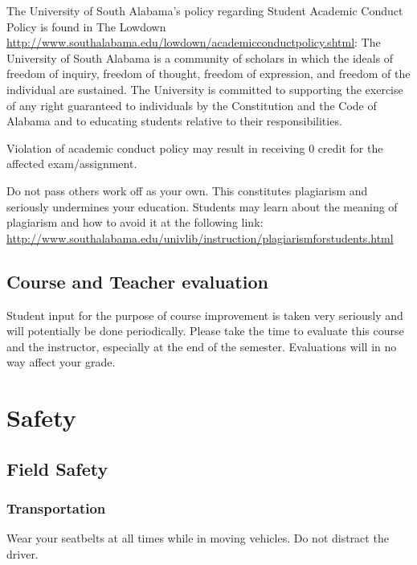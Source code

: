 \documentclass[11pt,]{article}
\begin{document}
The University of South Alabama's policy regarding Student Academic
Conduct Policy is found in The Lowdown
\url{http://www.southalabama.edu/lowdown/academicconductpolicy.shtml}:
The University of South Alabama is a community of scholars in which the
ideals of freedom of inquiry, freedom of thought, freedom of expression,
and freedom of the individual are sustained. The University is committed
to supporting the exercise of any right guaranteed to individuals by the
Constitution and the Code of Alabama and to educating students relative
to their responsibilities.

Violation of academic conduct policy may result in receiving 0 credit
for the affected exam/assignment.

Do not pass others work off as your own. This constitutes plagiarism and
seriously undermines your education. Students may learn about the
meaning of plagiarism and how to avoid it at the following link:
\url{http://www.southalabama.edu/univlib/instruction/plagiarismforstudents.html}

\hypertarget{course-and-teacher-evaluation}{%
\subsection{Course and Teacher
evaluation}\label{course-and-teacher-evaluation}}

Student input for the purpose of course improvement is taken very
seriously and will potentially be done periodically. Please take the
time to evaluate this course and the instructor, especially at the end
of the semester. Evaluations will in no way affect your grade.

\newpage

\hypertarget{safety}{%
\section{Safety}\label{safety}}

\hypertarget{field-safety}{%
\subsection{Field Safety}\label{field-safety}}

\hypertarget{transportation}{%
\subsubsection{Transportation}\label{transportation}}

Wear your seatbelts at all times while in moving vehicles. Do not
distract the driver.
\end{document}

